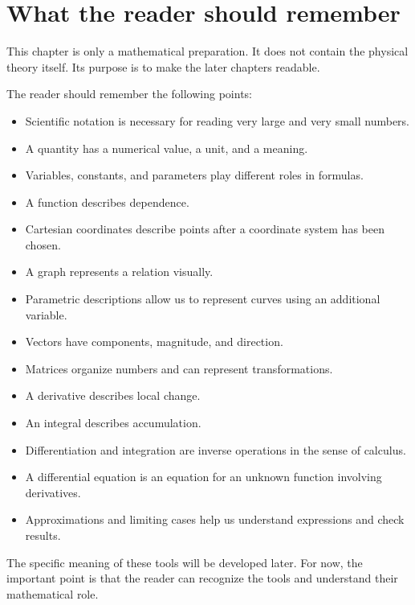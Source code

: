 \section{What the reader should remember}

This chapter is only a mathematical preparation. It does not contain the physical theory itself. Its purpose is to make the later chapters readable.

\begin{summarybox}
The reader should remember the following points:
\begin{itemize}
    \item Scientific notation is necessary for reading very large and very small numbers.
    \item A quantity has a numerical value, a unit, and a meaning.
    \item Variables, constants, and parameters play different roles in formulas.
    \item A function describes dependence.
    \item Cartesian coordinates describe points after a coordinate system has been chosen.
    \item A graph represents a relation visually.
    \item Parametric descriptions allow us to represent curves using an additional variable.
    \item Vectors have components, magnitude, and direction.
    \item Matrices organize numbers and can represent transformations.
    \item A derivative describes local change.
    \item An integral describes accumulation.
    \item Differentiation and integration are inverse operations in the sense of calculus.
    \item A differential equation is an equation for an unknown function involving derivatives.
    \item Approximations and limiting cases help us understand expressions and check results.
\end{itemize}
\end{summarybox}

The specific meaning of these tools will be developed later. For now, the important point is that the reader can recognize the tools and understand their mathematical role.
